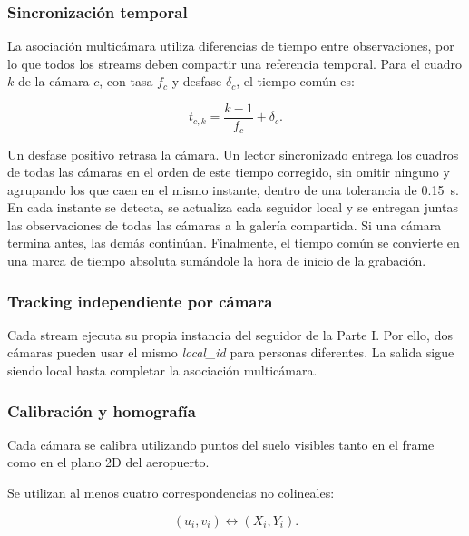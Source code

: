 \documentclass[12pt,letterpaper]{article}
\begin{document}
\subsubsection{Sincronización temporal}

La asociación multicámara utiliza diferencias de tiempo entre
observaciones, por lo que todos los streams deben compartir una
referencia temporal. Para el cuadro $k$ de la cámara $c$, con tasa $f_c$
y desfase $\delta_c$, el tiempo común es:

\begin{equation}
t_{c,k}=\frac{k-1}{f_c}+\delta_c .
\end{equation}

Un desfase positivo retrasa la cámara. Un lector sincronizado entrega
los cuadros de todas las cámaras en el orden de este tiempo corregido,
sin omitir ninguno y agrupando los que caen en el mismo instante, dentro
de una tolerancia de 0.15~s. En cada instante se detecta, se actualiza
cada seguidor local y se entregan juntas las observaciones de todas las
cámaras a la galería compartida. Si una cámara termina antes, las demás
continúan. Finalmente, el tiempo común se convierte en una marca de
tiempo absoluta sumándole la hora de inicio de la grabación.

\subsubsection{Tracking independiente por cámara}

Cada stream ejecuta su propia instancia del seguidor de la Parte I. Por
ello, dos cámaras pueden usar el mismo \textit{local\_id} para personas
diferentes. La salida sigue siendo local hasta completar la asociación
multicámara.

\subsubsection{Calibración y homografía}

Cada cámara se calibra utilizando puntos del suelo visibles tanto en el
frame como en el plano 2D del aeropuerto.

Se utilizan al menos cuatro correspondencias no colineales:

\begin{equation}
(u_i,v_i)
\leftrightarrow
(X_i,Y_i).
\end{equation}
\end{document}
